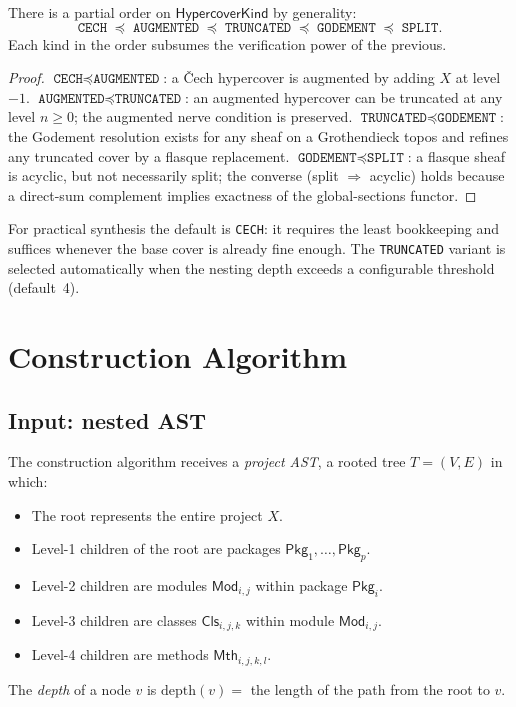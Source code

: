 \documentclass[11pt]{article}
\newcommand{\HCK}{\mathsf{HypercoverKind}} %
\newcommand{\Pkg}{\mathsf{Pkg}}           %
\newcommand{\Mod}{\mathsf{Mod}}           %
\newcommand{\Cls}{\mathsf{Cls}}           %
\newcommand{\Mth}{\mathsf{Mth}}           %
\newcommand{\depth}{\mathrm{depth}}       %
\newcommand{\KindCech}{\texttt{CECH}}
\newcommand{\KindGod}{\texttt{GODEMENT}}
\newcommand{\KindSplit}{\texttt{SPLIT}}
\newcommand{\KindTrunc}{\texttt{TRUNCATED}}
\newcommand{\KindAug}{\texttt{AUGMENTED}}
\begin{document}
\begin{proposition}\label{prop:ordering}
  There is a partial order on $\HCK$ by generality:
  \[
    \KindCech \;\preceq\; \KindAug \;\preceq\; \KindTrunc
    \;\preceq\; \KindGod \;\preceq\; \KindSplit.
  \]
  Each kind in the order subsumes the verification power of the previous.
\end{proposition}

\begin{proof}
  $\KindCech \preceq \KindAug$: a Čech hypercover is augmented by
  adding $X$ at level $-1$.  $\KindAug \preceq \KindTrunc$: an augmented
  hypercover can be truncated at any level $n \ge 0$; the augmented nerve
  condition is preserved.  $\KindTrunc \preceq \KindGod$: the Godement
  resolution exists for any sheaf on a Grothendieck topos and refines any
  truncated cover by a flasque replacement.  $\KindGod \preceq \KindSplit$:
  a flasque sheaf is acyclic, but not necessarily split; the converse
  (split $\Rightarrow$ acyclic) holds because a direct-sum complement
  implies exactness of the global-sections functor.
\end{proof}

\begin{remark}
  For practical synthesis the default is \KindCech{}: it requires the
  least bookkeeping and suffices whenever the base cover is already
  fine enough.  The \KindTrunc{} variant is selected automatically
  when the nesting depth exceeds a configurable threshold (default~4).
\end{remark}

\section{Construction Algorithm}\label{sec:algo}

\subsection{Input: nested AST}

The construction algorithm receives a \emph{project AST}, a rooted
tree $T = (V, E)$ in which:
\begin{itemize}
  \item The root represents the entire project $X$.
  \item Level-1 children of the root are packages $\Pkg_1, \ldots, \Pkg_p$.
  \item Level-2 children are modules $\Mod_{i,j}$ within package $\Pkg_i$.
  \item Level-3 children are classes $\Cls_{i,j,k}$ within module $\Mod_{i,j}$.
  \item Level-4 children are methods $\Mth_{i,j,k,l}$.
\end{itemize}
The \emph{depth} of a node $v$ is $\depth(v) = $ the length of the path
from the root to $v$.
\end{document}
